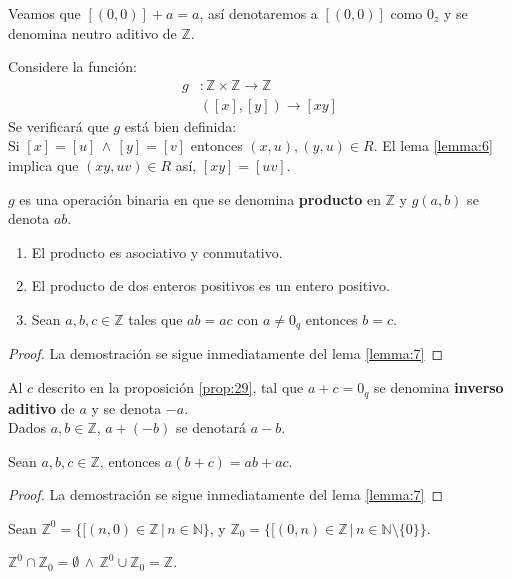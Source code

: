 \begin{remark}
  Veamos que $[(0,0)]+a = a$, así denotaremos a $[(0,0)]$ como $0_z$ y se
  denomina neutro aditivo de $\mathbb{Z}$.
\end{remark}
Considere la función: 
\begin{align*} 
  g&: \mathbb{Z} \times \mathbb{Z} \rightarrow \mathbb{Z} \\
   &([x],[y]) \rightarrow [xy]
\end{align*}
Se verificará que $g$ está bien definida: \\
Si $[x] = [u] \, \land \, [y] = [v]$ entonces $(x,u), (y,u) \in R$. El lema
\ref{lemma:6} implica que $(xy, uv) \in R$ así, $[xy] = [uv]$.
\begin{definition}
  $g$ es una operación binaria en  que se denomina \textbf{producto}
  en $\mathbb{Z}$ y $g(a,b)$ se denota $ab$.
\end{definition}
\begin{proposition}\label{prop:30}
  \begin{enumerate}
    \item El producto es asociativo y conmutativo.
    \item El producto de dos enteros positivos es un entero positivo.
    \item Sean $a,b,c \in \mathbb{Z}$ tales que $ab =ac$ con $a \neq 0_q$
      entonces $b = c$.
  \end{enumerate}
\end{proposition}
\begin{proof} La demostración se sigue inmediatamente del lema \ref{lemma:7}
\end{proof}
\begin{definition} Al $c$ descrito en la proposición \ref{prop:29}, tal que
  $a + c = 0_q$ se denomina \textbf{inverso aditivo} de $a$ y se denota
  $-a$.\\
  Dados $a,b \in \mathbb{Z}$, $a + (-b)$ se denotará $a -b$.
\end{definition}
\begin{proposition}\label{prop:31} Sean $a, b, c \in \mathbb{Z}$, entonces $a(b + c) = ab +
  ac$.
\end{proposition}
\begin{proof} La demostración se sigue inmediatamente del lema \ref{lemma:7}
\end{proof}
Sean $\mathbb{Z}^0 = \{ [(n,0) \in \mathbb{Z} \, | \, n \in \mathbb{N} \}$, y
$\mathbb{Z}_0 = \{ [(0,n) \in \mathbb{Z} \, | \, n \in \mathbb{N}\setminus\{0\} \}$.
\begin{proposition}\label{prop:32}
  $\mathbb{Z}^0 \cap \mathbb{Z}_0 = \emptyset \, \land \, \mathbb{Z}^0 \cup
  \mathbb{Z}_0 = \mathbb{Z}$.
\end{proposition}
